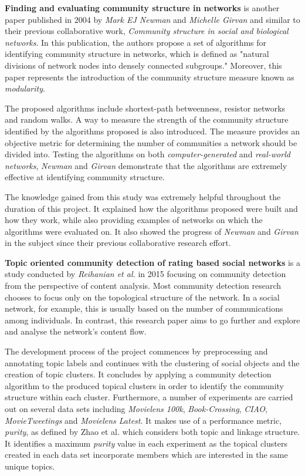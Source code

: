 \textbf{Finding and evaluating community structure in networks}
\cite{newman2004finding} is another paper published in 2004 by \textit{Mark EJ Newman} and \textit{Michelle Girvan} and similar to their previous collaborative work, \textit{Community structure in social and biological networks}. In this publication, the authors propose a set of algorithms for identifying community structure in networks, which is defined as "natural divisions of network nodes into densely connected subgroups." Moreover, this paper represents the introduction of the community structure measure known as \textit{modularity}.

The proposed algorithms include shortest-path betweenness, resistor networks and random walks. A way to measure the strength of the community structure identified by the algorithms proposed is also introduced. The measure provides an objective metric for determining the number of communities a network should be divided into. Testing the algorithms on both \textit{computer-generated} and \textit{real-world networks}, \textit{Newman} and \textit{Girvan} demonstrate that the algorithms are extremely effective at identifying community structure.

The knowledge gained from this study was extremely helpful throughout the duration of this project. It explained how the algorithms proposed were built and how they work, while also providing examples of networks on which the algorithms were evaluated on. It also showed the progress of \textit{Newman} and \textit{Girvan} in the subject since their previous collaborative research effort.

\vspace*{1em}

\textbf{Topic oriented community detection of rating based social networks} is a study conducted by \textit{Reihanian et al.} \cite{reihanian2015topic} in 2015 focusing on community detection from the perspective of content analysis. Most community detection research chooses to focus only on the topological structure of the network. In a social network, for example, this is usually based on the number of communications among individuals. In contrast, this research paper aims to go further and explore and analyse the network's content flow.

The development process of the project commences by preprocessing and annotating topic labels and continues with the clustering of social objects and the creation of topic clusters. It concludes by applying a community detection algorithm to the produced topical clusters in order to identify the community structure within each cluster. Furthermore, a number of experiments are carried out on several data sets including \textit{Movielens 100k}, \textit{Book-Crossing}, \textit{CIAO}, \textit{MovieTweetings} and \textit{Movielens Latest}. It makes use of a performance metric, \textit{purity}, as defined by Zhao et al. \cite{zhao2012topic} which considers both topic and linkage structure. It identifies a maximum \textit{purity} value in each experiment as the topical clusters created in each data set incorporate members which are interested in the same unique topics.

